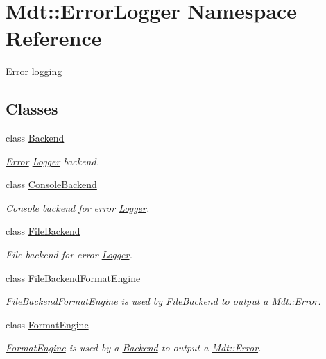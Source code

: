 \hypertarget{namespace_mdt_1_1_error_logger}{}\section{Mdt\+:\+:Error\+Logger Namespace Reference}
\label{namespace_mdt_1_1_error_logger}


Error logging  


\subsection*{Classes}
\begin{DoxyCompactItemize}
\item 
class \hyperlink{class_mdt_1_1_error_logger_1_1_backend}{Backend}
\begin{DoxyCompactList}\small\item\em \hyperlink{class_mdt_1_1_error}{Error} \hyperlink{class_mdt_1_1_error_logger_1_1_logger}{Logger} backend. \end{DoxyCompactList}\item 
class \hyperlink{class_mdt_1_1_error_logger_1_1_console_backend}{Console\+Backend}
\begin{DoxyCompactList}\small\item\em Console backend for error \hyperlink{class_mdt_1_1_error_logger_1_1_logger}{Logger}. \end{DoxyCompactList}\item 
class \hyperlink{class_mdt_1_1_error_logger_1_1_file_backend}{File\+Backend}
\begin{DoxyCompactList}\small\item\em File backend for error \hyperlink{class_mdt_1_1_error_logger_1_1_logger}{Logger}. \end{DoxyCompactList}\item 
class \hyperlink{class_mdt_1_1_error_logger_1_1_file_backend_format_engine}{File\+Backend\+Format\+Engine}
\begin{DoxyCompactList}\small\item\em \hyperlink{class_mdt_1_1_error_logger_1_1_file_backend_format_engine}{File\+Backend\+Format\+Engine} is used by \hyperlink{class_mdt_1_1_error_logger_1_1_file_backend}{File\+Backend} to output a \hyperlink{class_mdt_1_1_error}{Mdt\+::\+Error}. \end{DoxyCompactList}\item 
class \hyperlink{class_mdt_1_1_error_logger_1_1_format_engine}{Format\+Engine}
\begin{DoxyCompactList}\small\item\em \hyperlink{class_mdt_1_1_error_logger_1_1_format_engine}{Format\+Engine} is used by a \hyperlink{class_mdt_1_1_error_logger_1_1_backend}{Backend} to output a \hyperlink{class_mdt_1_1_error}{Mdt\+::\+Error}. \end{DoxyCompactList}\item 

\end{DoxyCompactItemize}
